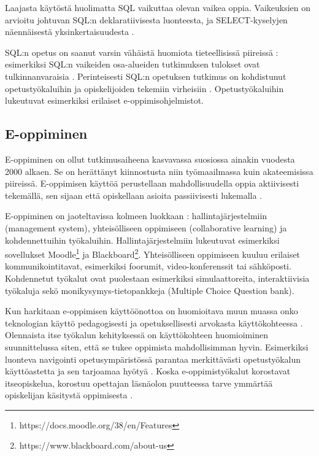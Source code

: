 \documentclass[finnish,twoside,openright]{HYgraduMLDS}
\begin{document}
Laajasta käytöstä huolimatta SQL vaikuttaa olevan vaikea oppia. Vaikeuksien on arvioitu johtuvan SQL:n deklaratiivisesta luonteesta, ja SELECT-kyselyjen näennäisestä yksinkertaisuudesta \cite{sadiq2004sqlator}.

SQL:n opetus on saanut varsin vähäistä huomiota tieteellisissä piireissä \cite{Taipalus:2019:EFS:3287324.3287359}: esimerkiksi SQL:n vaikeiden osa-alueiden tutkimuksen tulokset ovat tulkinnanvaraisia \cite{Taipalus:2019:EFS:3287324.3287359}. Perinteisesti SQL:n opetuksen tutkimus on kohdistunut opetustyökaluihin ja opiskelijoiden tekemiin virheisiin \cite{Taipalus:2019:EFS:3287324.3287359}. Opetustyökaluihin lukeutuvat esimerkiksi erilaiset e-oppimisohjelmistot.

\subsection{E-oppiminen}

E-oppiminen on ollut tutkimusaiheena kasvavassa suosiossa ainakin vuodesta 2000 alkaen. Se on herättänyt kiinnostusta niin työmaailmassa kuin akateemisissa piireissä. E-oppimisen käyttöä perustellaan mahdollisuudella oppia aktiivisesti tekemällä, sen sijaan että opiskellaan asioita passiivisesti lukemalla \cite{Brusilovsky:2010:LSP:1656255.1656257}. 

E-oppiminen on jaoteltavissa kolmeen luokkaan \cite{sadiq2004sqlator}: hallintajärjestelmiin (management system), yhteisölliseen oppimiseen (collaborative learning) ja kohdennettuihin työkaluihin. Hallintajärjestelmiin lukeutuvat esimerkiksi sovellukset Moodle\footnote{https://docs.moodle.org/38/en/Features} ja Blackboard\footnote{https://www.blackboard.com/about-us}. Yhteisölliseen oppimiseen kuuluu erilaiset kommunikointitavat, esimerkiksi foorumit, video-konferenssit tai sähköposti. Kohdennetut työkalut ovat puolestaan esimerkiksi simulaattoreita, interaktiivisia työkaluja sekö monikysymys-tietopankkeja (Multiple Choice Question bank).

Kun harkitaan e-oppimisen käyttöönottoa on huomioitava muun muassa onko teknologian käyttö pedagogisesti ja opetuksellisesti arvokasta käyttökohteessa \cite{sadiq2004sqlator}. Olennaista itse työkalun kehityksessä on käyttökohteen huomioiminen suunnittelussa siten, että se tukee oppimista mahdollisimman hyvin. Esimerkiksi luonteva navigointi opetusympäristössä parantaa merkittävästi opetustyökalun käyttöastetta ja sen tarjoamaa hyötyä \cite{Brusilovsky:2010:LSP:1656255.1656257}. Koska e-oppimistyökalut korostavat itseopiskelua, korostuu opettajan läsnäolon puutteessa tarve ymmärtää opiskelijan käsitystä oppimisesta \cite{sadiq2004sqlator}.
\end{document}
